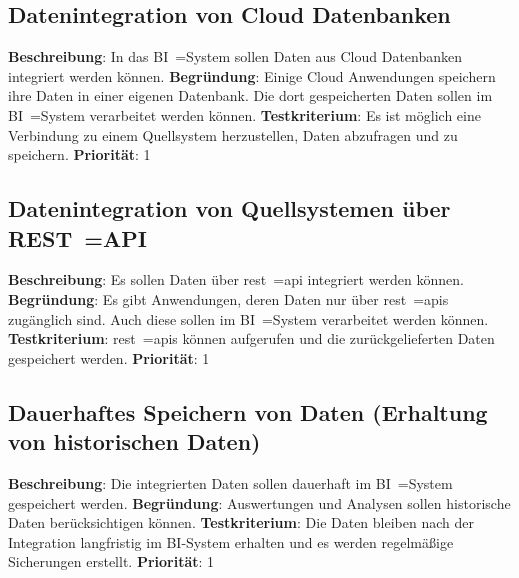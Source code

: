 \subsection{Datenintegration von Cloud Datenbanken} \label{sec:anforderungsspezifikation:datenintegrationCloudDB}
\textbf{Beschreibung}: In das BI~=System sollen Daten aus Cloud Datenbanken integriert werden können.
\newline \textbf{Begründung}: Einige Cloud Anwendungen speichern ihre Daten in einer eigenen Datenbank. Die dort gespeicherten Daten sollen im BI~=System verarbeitet werden können.
\newline \textbf{Testkriterium}: Es ist möglich eine Verbindung zu einem Quellsystem herzustellen, Daten abzufragen und zu speichern.
\newline \textbf{Priorität}: 1

\subsection{Datenintegration von Quellsystemen über REST~=API} \label{sec:anforderungsspezifikation:datenintegrationREST}
\textbf{Beschreibung}: Es sollen Daten über \ac{rest}~=\ac{api} integriert werden können.
\newline \textbf{Begründung}: Es gibt Anwendungen, deren Daten nur über \ac{rest}~=\acp{api} zugänglich sind. Auch diese sollen im BI~=System verarbeitet werden können.
\newline \textbf{Testkriterium}: \ac{rest}~=\acp{api} können aufgerufen und die zurückgelieferten Daten gespeichert werden.
\newline \textbf{Priorität}: 1

\subsection[Langfristige Datenspeicherung]{Dauerhaftes Speichern von Daten (Erhaltung von historischen Daten)} \label{sec:anforderungsspezifikation:dauerhaftesSpeichern}
\textbf{Beschreibung}: Die integrierten Daten sollen dauerhaft im BI~=System gespeichert werden.
\newline \textbf{Begründung}: Auswertungen und Analysen sollen historische Daten berücksichtigen können.
\newline \textbf{Testkriterium}: Die Daten bleiben nach der Integration langfristig im BI-System erhalten und es werden regelmäßige Sicherungen erstellt.
\newline \textbf{Priorität}: 1

